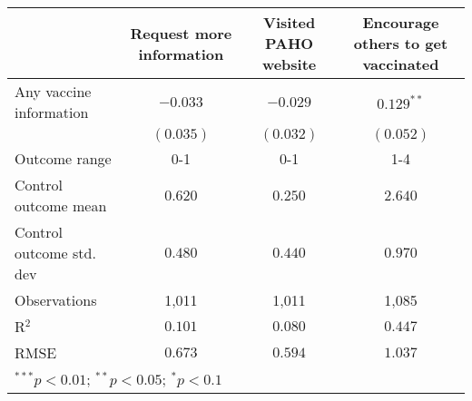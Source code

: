 \begin{table}
\begin{center}
\begin{tabular}{l c c c}
\hline
 & Request more information & Visited PAHO website & Encourage others to get vaccinated \\
\hline
Any vaccine information  & $-0.033$  & $-0.029$  & $0.129^{**}$ \\
                         & $(0.035)$ & $(0.032)$ & $(0.052)$    \\
\hline
Outcome range            & 0-1       & 0-1       & 1-4          \\
Control outcome mean     & $0.620$   & $0.250$   & $2.640$      \\
Control outcome std. dev & $0.480$   & $0.440$   & $0.970$      \\
Observations             & 1,011     & 1,011     & 1,085        \\
R$^{2}$                  & $0.101$   & $0.080$   & $0.447$      \\
RMSE                     & $0.673$   & $0.594$   & $1.037$      \\
\hline
\multicolumn{4}{l}{\scriptsize{$^{***}p<0.01$; $^{**}p<0.05$; $^{*}p<0.1$}}
\end{tabular}
\caption{}
\label{table:Tables and Figures/SI_table21_anyinfo_Colombia_behav}
\end{center}
\end{table}
